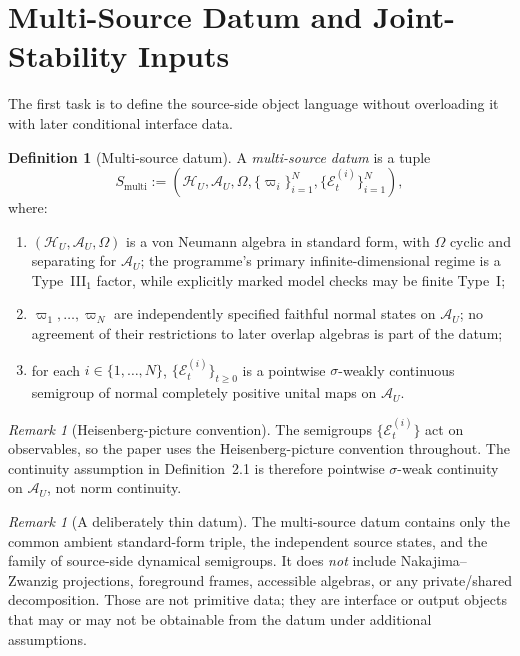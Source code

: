 \documentclass[12pt]{article}
\theoremstyle{definition}
\newtheorem{definition}[theorem]{Definition}
\theoremstyle{remark}
\newtheorem{remark}[theorem]{Remark}
\begin{document}
\section{Multi-Source Datum and Joint-Stability Inputs}\label{sec:datum}

The first task is to define the source-side object language without
overloading it with later conditional interface data.

\begin{definition}[Multi-source datum]
A \emph{multi-source datum} is a tuple
\[
S_{\mathrm{multi}}
:=
(\mathcal H_U,\mathcal A_U,\Omega,
 \{\varpi_i\}_{i=1}^N,\{\mathcal E_t^{(i)}\}_{i=1}^N),
\]
where:
\begin{enumerate}
\item \((\mathcal H_U,\mathcal A_U,\Omega)\) is a von Neumann algebra in
  standard form, with \(\Omega\) cyclic and separating for
  \(\mathcal A_U\); the programme's primary infinite-dimensional regime
  is a Type~III\(_1\) factor, while explicitly marked model checks may be
  finite Type~I;
\item \(\varpi_1,\dots,\varpi_N\) are independently specified faithful
  normal states on \(\mathcal A_U\); no agreement of their restrictions
  to later overlap algebras is part of the datum;
\item for each \(i\in\{1,\dots,N\}\),
  \(\{\mathcal E_t^{(i)}\}_{t\ge 0}\) is a pointwise
  \(\sigma\)-weakly continuous semigroup of normal completely positive
  unital maps on \(\mathcal A_U\).
\end{enumerate}
\end{definition}

\begin{remark}[Heisenberg-picture convention]
The semigroups \(\{\mathcal E_t^{(i)}\}\) act on observables, so the
paper uses the Heisenberg-picture convention throughout. The continuity
assumption in Definition~2.1 is therefore pointwise \(\sigma\)-weak
continuity on \(\mathcal A_U\), not norm continuity.
\end{remark}

\begin{remark}[A deliberately thin datum]
The multi-source datum contains only the common ambient standard-form
triple, the independent source states, and the family of source-side
dynamical semigroups. It does
\emph{not} include Nakajima--Zwanzig projections, foreground frames,
accessible algebras, or any private/shared decomposition. Those are not
primitive data; they are interface or output objects that may or may not
be obtainable from the datum under additional assumptions.
\end{remark}
\end{document}
